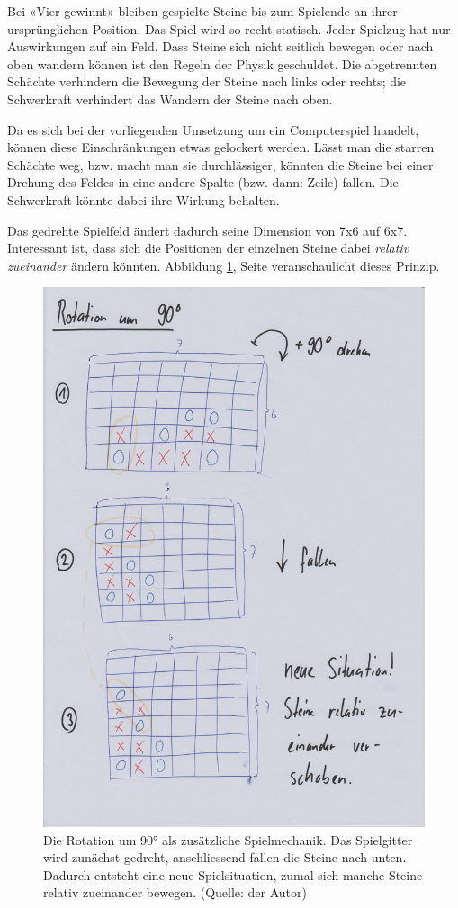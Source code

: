 \documentclass[a4paper,11pt,hidelinks]{scrartcl}
\newcommand{\imgref}[1]{{Abbildung \ref{#1}, Seite \pageref{#1}}}
\begin{document}
Bei «Vier gewinnt» bleiben gespielte Steine bis zum Spielende an ihrer ursprünglichen Position. Das Spiel wird so recht statisch. Jeder Spielzug hat nur Auswirkungen auf ein Feld. Dass Steine sich nicht seitlich bewegen oder nach oben wandern können ist den Regeln der Physik geschuldet. Die abgetrennten Schächte verhindern die Bewegung der Steine nach links oder rechts; die Schwerkraft verhindert das Wandern der Steine nach oben.

Da es sich bei der vorliegenden Umsetzung um ein Computerspiel handelt, können diese Einschränkungen etwas gelockert werden. Lässt man die starren Schächte weg, bzw. macht man sie durchlässiger, könnten die Steine bei einer Drehung des Feldes in eine andere Spalte (bzw. dann: Zeile) fallen. Die Schwerkraft könnte dabei ihre Wirkung behalten.

Das gedrehte Spielfeld ändert dadurch seine Dimension von 7x6 auf 6x7. Interessant ist, dass sich die Positionen der einzelnen Steine dabei \textit{relativ zueinander} ändern könnten. \imgref{fig:rotation} veranschaulicht dieses Prinzip.

\begin{figure}
    \centering
    \includegraphics[width=0.9\linewidth]{pics/rotation-papier.jpg}
    \caption{Die Rotation um 90° als zusätzliche Spielmechanik. Das Spielgitter wird zunächst gedreht, anschliessend fallen die Steine nach unten. Dadurch entsteht eine neue Spielsituation, zumal sich manche Steine relativ zueinander bewegen. (Quelle: der Autor)}
    \label{fig:rotation}
\end{figure}
\end{document}
